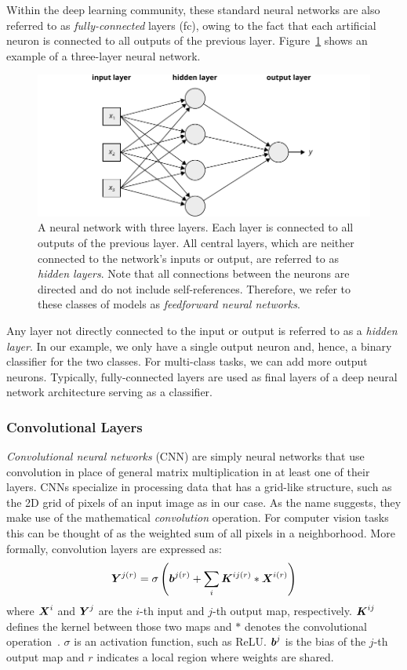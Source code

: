 Within the deep learning community, these standard neural networks are also referred to as \emph{fully-connected} layers (\ac{fc}), owing to the fact that each artificial neuron is connected to all outputs of the previous layer. Figure~\ref{fig:nn} shows an example of a three-layer neural network.
%
	\begin{figure}[tp]
  		\centering
    	\includegraphics{img/nn.pdf}
    	\caption{A neural network with three layers. Each layer is connected to all outputs of the previous layer. All central layers, which are neither connected to the network's inputs or output, are referred to as \emph{hidden layers}. Note that all connections between the neurons are directed and do not include self-references. Therefore, we refer to these classes of models as \emph{feedforward neural networks}.}
    	\label{fig:nn}
	\end{figure}
%
Any layer not directly connected to the input or output is referred to as a \emph{hidden layer}. In our example, we only have a single output neuron and, hence, a binary classifier for the two classes. For multi-class tasks, we can add more output neurons. Typically, fully-connected layers are used as final layers of a deep neural network architecture serving as a classifier.

\subsubsection{Convolutional Layers}
\emph{Convolutional neural networks} (CNN) are simply neural networks that use convolution in place of general matrix multiplication in at least one of their layers. CNNs specialize in processing data that has a grid-like structure, such as the 2D grid of pixels of an input image as in our case. As the name suggests, they make use of the mathematical \emph{convolution} operation. For computer vision tasks this can be thought of as the weighted sum of all pixels in a neighborhood. More formally, convolution layers are expressed as:
%
$$
\boldsymbol{Y}^{j(r)} = \sigma \left( \boldsymbol{b}^{j(r)} + \sum_i \boldsymbol{K}^{ij(r)} \ast \boldsymbol{X}^{i(r)} \right)
$$
%
where $\boldsymbol{X}^i$ and $\boldsymbol{Y}^j$ are the $i$-th input and $j$-th output map, respectively. $\boldsymbol{K}^{ij}$ defines the kernel between those two maps and $\ast$ denotes the convolutional operation~\cite{sun2014deep}. $\sigma$ is an activation function, such as ReLU. $\boldsymbol{b}^j$ is the bias of the $j$-th output map and $r$ indicates a local region where weights are shared.

